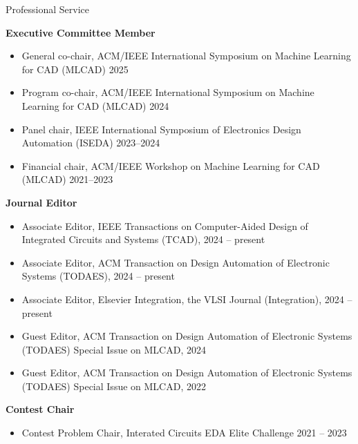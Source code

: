 
\begin{rSection}{Professional Service}

\textbf{Executive Committee Member}
\begin{itemize}
    \item General co-chair, ACM/IEEE International Symposium on Machine Learning for CAD (MLCAD) 2025
    \item Program co-chair, ACM/IEEE International Symposium on Machine Learning for CAD (MLCAD) 2024
    \item Panel chair, IEEE International Symposium of Electronics Design Automation (ISEDA) 2023--2024
    \item Financial chair, ACM/IEEE Workshop on Machine Learning for CAD (MLCAD) 2021--2023 
\end{itemize}

\textbf{Journal Editor}
\begin{itemize}
    \item Associate Editor, IEEE Transactions on Computer-Aided Design of Integrated Circuits and Systems (TCAD), 2024 -- present
    \item Associate Editor, ACM Transaction on Design Automation of Electronic Systems (TODAES), 2024 -- present
    \item Associate Editor, Elsevier Integration, the VLSI Journal (Integration), 2024 -- present
    \item Guest Editor, ACM Transaction on Design Automation of Electronic Systems (TODAES) Special Issue on MLCAD, 2024
    \item Guest Editor, ACM Transaction on Design Automation of Electronic Systems (TODAES) Special Issue on MLCAD, 2022
\end{itemize}

\textbf{Contest Chair}
\begin{itemize}
    \item Contest Problem Chair, Interated Circuits EDA Elite Challenge 2021 -- 2023
\end{itemize}


\end{rSection}
